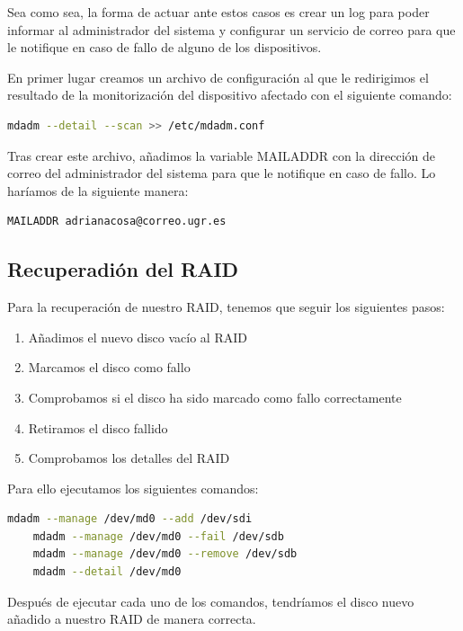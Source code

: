 Sea como sea, la forma de actuar ante estos casos es crear un log para poder informar al administrador del sistema y configurar un servicio de correo para que le notifique en caso de fallo de alguno de los dispositivos.

En primer lugar creamos un archivo de configuración al que le redirigimos el resultado de la monitorización del dispositivo afectado con el siguiente comando:

\begin{lstlisting}[language=bash]
	mdadm --detail --scan >> /etc/mdadm.conf
\end{lstlisting}

Tras crear este archivo, añadimos la variable MAILADDR con la dirección de correo del administrador del sistema para que le notifique en caso de fallo. Lo haríamos de la siguiente manera:

\begin{lstlisting}[language=bash]
	MAILADDR adrianacosa@correo.ugr.es
\end{lstlisting}


\subsection{Recuperadión del RAID}

Para la recuperación de nuestro RAID, tenemos que seguir los siguientes pasos:

\begin{enumerate}
	\item Añadimos el nuevo disco vacío al RAID
	\item Marcamos el disco como fallo
	\item Comprobamos si el disco ha sido marcado como fallo correctamente
	\item Retiramos el disco fallido
	\item Comprobamos los detalles del RAID
\end{enumerate}

Para ello ejecutamos los siguientes comandos:

\begin{lstlisting}[language=bash]
	mdadm --manage /dev/md0 --add /dev/sdi
	mdadm --manage /dev/md0 --fail /dev/sdb
	mdadm --manage /dev/md0 --remove /dev/sdb
	mdadm --detail /dev/md0
\end{lstlisting}

Después de ejecutar cada uno de los comandos, tendríamos el disco nuevo añadido a nuestro RAID de manera correcta.

